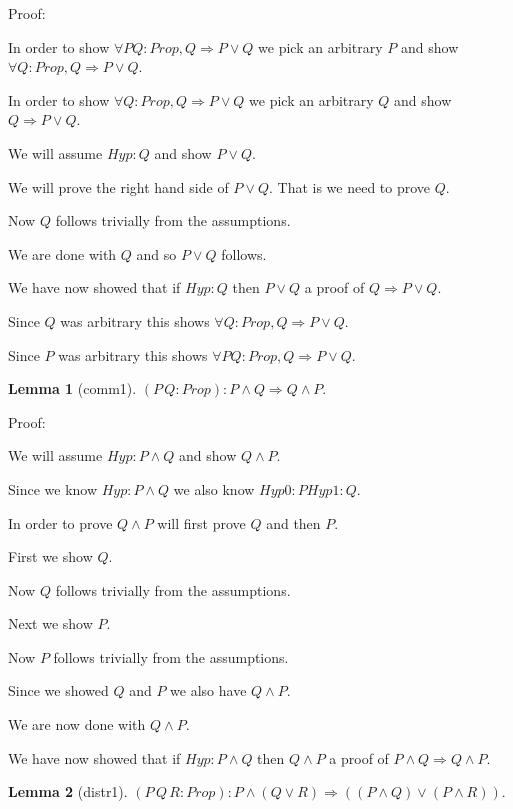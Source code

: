 \documentclass[11pt, oneside]{article}
\newtheorem{Lemma}{Lemma}
\begin{document}
 Proof: \begin{subproof}In order to show $\forall P Q : Prop, Q \Rightarrow P \lor Q $ we pick an arbitrary $P$ and show $\forall Q : Prop, Q \Rightarrow P \lor Q $.

 \begin{subproof}In order to show $\forall Q : Prop, Q \Rightarrow P \lor Q $ we pick an arbitrary $Q$ and show $Q \Rightarrow P \lor Q $.

 \begin{subproof}We will assume $Hyp : Q $ and show $P \lor Q $.\begin{subproof}We will prove the right hand side of $P \lor Q $. That is we need to prove $Q $.\begin{subproof}Now $Q $ follows trivially from the assumptions.\end{subproof} We are done with $Q $ and so $P \lor Q $ follows.\end{subproof} We have now showed that if $Hyp : Q $ then $P \lor Q $ a proof of $Q \Rightarrow P \lor Q $.\end{subproof} Since $Q$ was arbitrary this shows $\forall Q : Prop, Q \Rightarrow P \lor Q $.\end{subproof} Since $P$ was arbitrary this shows $\forall P Q : Prop, Q \Rightarrow P \lor Q $.\end{subproof}\begin{Lemma}[comm1] 
$(P\,Q:Prop):P\land Q\Rightarrow Q\land P.$
 \end{Lemma}


 Proof: \begin{subproof}We will assume $Hyp : P \land Q $ and show $Q \land P $.\begin{subproof}Since we know $Hyp : P \land Q $ we also know $Hyp0 : P 
Hyp1 : Q $.\begin{subproof}In order to prove $Q \land P $ will first prove $Q $ and then $P $.

 First we show $Q $.\begin{subproof}Now $Q $ follows trivially from the assumptions.\end{subproof} Next we show $P $.\begin{subproof}Now $P $ follows trivially from the assumptions.\end{subproof} Since we showed $Q $ and $P $ we also have $Q \land P $.\end{subproof} We are now done with $Q \land P $.\end{subproof} We have now showed that if $Hyp : P \land Q $ then $Q \land P $ a proof of $P \land Q \Rightarrow Q \land P $.\end{subproof}\begin{Lemma}[distr1] 
$(P\,Q\,R:Prop):P\land (Q\lor R)\Rightarrow ((P\land Q)\lor (P\land R)).$
 \end{Lemma}
\end{document}
